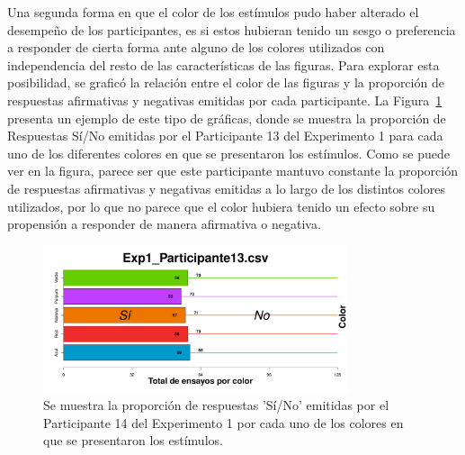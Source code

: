 \begin{itemize}
Una segunda forma en que el color de los estímulos pudo haber alterado el desempeño de los participantes, es si estos hubieran tenido un sesgo o preferencia a responder de cierta forma ante alguno de los colores utilizados con independencia del resto de las características de las figuras. Para explorar esta posibilidad, se graficó la relación entre el color de las figuras y la proporción de respuestas afirmativas y negativas emitidas por cada participante. La Figura~\ref{fig:BiasCol_E1_P13} presenta un ejemplo de este tipo de gráficas, donde se muestra la proporción de Respuestas Sí/No emitidas por el Participante 13 del Experimento 1 para cada uno de los diferentes colores en que se presentaron los estímulos. Como se puede ver en la figura, parece ser que este participante mantuvo constante la proporción de respuestas afirmativas y negativas emitidas a lo largo de los distintos colores utilizados, por lo que no parece que el color hubiera tenido un efecto sobre su propensión a responder de manera afirmativa o negativa.\\

\begin{figure}[th]
\centering
\includegraphics[width=0.80\textwidth]{Figures/BiasColor_Exp1_P13}
\caption[Explorando datos individuales (ejemplo): Proporción de respuestas 'Sí' y 'No' registradas por cada color de figura]{Se muestra la proporción de respuestas 'Sí/No' emitidas por el Participante 14 del Experimento 1 por cada uno de los colores en que se presentaron los estímulos.}
\label{fig:BiasCol_E1_P13}
\end{figure}
\end{itemize}


